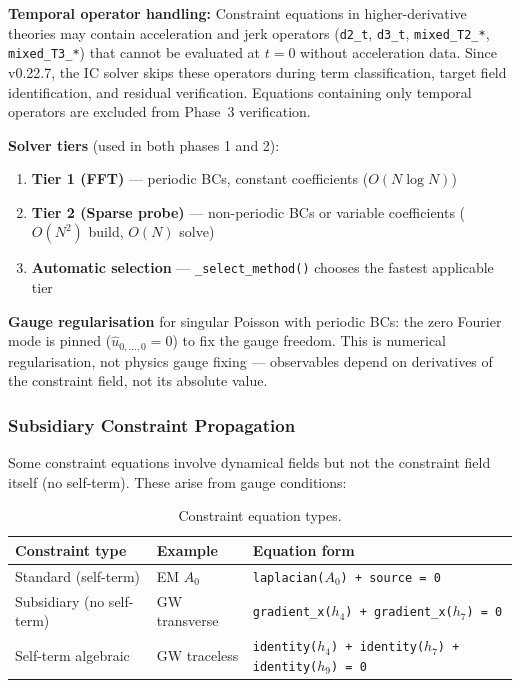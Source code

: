 \textbf{Temporal operator handling:} Constraint equations in higher-derivative theories may contain acceleration and jerk operators (\texttt{d2\_t}, \texttt{d3\_t}, \texttt{mixed\_T2\_*}, \texttt{mixed\_T3\_*}) that cannot be evaluated at $t=0$ without acceleration data. Since v0.22.7, the IC solver skips these operators during term classification, target field identification, and residual verification. Equations containing only temporal operators are excluded from Phase~3 verification.

\textbf{Solver tiers} (used in both phases 1 and 2):
\begin{enumerate}
  \item \textbf{Tier 1 (FFT)} --- periodic BCs, constant coefficients ($O(N \log N)$)
  \item \textbf{Tier 2 (Sparse probe)} --- non-periodic BCs or variable coefficients ($O(N^2)$ build, $O(N)$ solve)
  \item \textbf{Automatic selection} --- \texttt{\_select\_method()} chooses the fastest applicable tier
\end{enumerate}

\textbf{Gauge regularisation} for singular Poisson with periodic BCs: the zero
Fourier mode is pinned ($\hat{u}_{0,\ldots,0} = 0$) to fix the gauge freedom.
This is numerical regularisation, not physics gauge fixing --- observables
depend on derivatives of the constraint field, not its absolute value.

\subsubsection{Subsidiary Constraint Propagation}
\label{sec:cf-subsidiary}

Some constraint equations involve dynamical fields but not the constraint
field itself (no self-term). These arise from gauge conditions:

\begin{table}[htbp]
\centering
\caption{Constraint equation types.}
\label{tab:cf-constraint-types}
\begin{tabular}{@{}llp{6cm}@{}}
\toprule
Constraint type & Example & Equation form \\
\midrule
Standard (self-term) & EM $A_0$ & \texttt{laplacian($A_0$) + source = 0} \\
Subsidiary (no self-term) & GW transverse & \texttt{gradient\_x($h_4$) + gradient\_x($h_7$) = 0} \\
Self-term algebraic & GW traceless & \texttt{identity($h_4$) + identity($h_7$) + identity($h_9$) = 0} \\
\bottomrule
\end{tabular}
\end{table}

